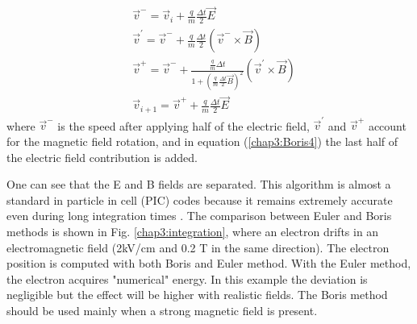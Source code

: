 \begin{refsection}
\begin{align}
     & \vec{v}^{-} = \vec{v}_{i} + \frac{q}{m} \frac{\Delta t}{2}\vec{E}                                                                 \\
     & \vec{v}^{'} = \vec{v}^{-} + \frac{q}{m} \frac{\Delta t}{2}(\vec{v}^{-} \times \vec{B})                                            \\
     & \vec{v}^{+} = \vec{v}^{-} + \frac{\frac{q}{m}\Delta t}{1+(\frac{q}{m} \frac{\Delta t}{2}\vec{B})^{2}}(\vec{v}^{'} \times \vec{B}) \\
     & \vec{v}_{i+1} = \vec{v}^{+} + \frac{q}{m} \frac{\Delta t}{2}\vec{E} \label{chap3:Boris4}
  \end{align}
  where $\vec{v}^{-}$ is the speed after applying half of the electric field, $\vec{v}^{'}$ and $\vec{v}^{+}$ account for the magnetic field rotation, and in equation (\ref{chap3:Boris4}) the last half of the electric field contribution is added.

  One can see that the E and B fields are separated. This algorithm is almost a standard in particle in cell (PIC) codes because it remains extremely accurate even during long integration times \cite{Qin2013}. The comparison between Euler and Boris methods is shown in Fig. \ref{chap3:integration}, where an electron drifts in an electromagnetic field (2kV/cm and 0.2 T in the same direction). The electron position is computed with both Boris and Euler method. With the Euler method, the electron acquires "numerical" energy. In this example the deviation is negligible but the effect will be higher with realistic fields. The Boris method should be used mainly when a strong magnetic field is present.


\end{refsection}
